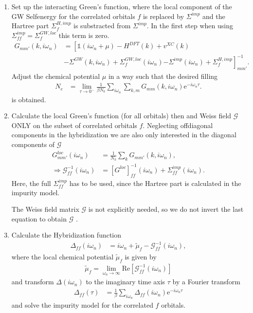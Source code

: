 \documentclass[12pt,a4paper]{scrartcl}
\numberwithin{equation}{section}
\newcommand{\GF}{Green's function}
\newcommand{\unity}{\mathds{1}}
\begin{document}
\begin{enumerate}
\item Set up the interacting {\GF}, where the local component of the GW
Selfenergy for the correlated orbitals $f$ is replaced by $\Sigma^{imp}$
and the Hartree part $\Sigma^{H,imp}_f$ is substracted from $\Sigma^{imp}$. 
In the first step when using $\Sigma^{imp}_{ff} =  \Sigma^{GW,loc}_{f}$ this 
term is zero.
\begin{align}
 G_{mm'}(k,i\omega_n) 
 &= \left[ \unity(i\omega_n+\mu ) -H^{DFT}(k) + v^{XC}(k) \right.\\
          &- \Sigma^{GW}(k,i\omega_n) 
          + \Sigma^{GW,loc}_f(i\omega_n)
          \left. - \Sigma^{imp}(i\omega_n)
          + \Sigma^{H,imp}_f \right]^{-1}_{mm'}.
\end{align}
Adjust the chemical potential $\mu$ in a way such that the desired
filling
\begin{align}
  N_e
 &= \lim_{\tau\rightarrow 0^-} \frac{1}{\beta N_k} 
                \sum_{i\omega_n}\sum_{k,m}G_{mm}(k,i\omega_n) \mathrm{e}^{-i\omega_n\tau}.
\end{align}
is obtained.

\item Calculate the local {\GF} (for all orbitals) then and Weiss field $\mathscr{G}$ ONLY
on the subset of correlated orbitals $f$. Neglecting
offdiagonal components in the hybridization we are also only interested 
in the diagonal components of $\mathscr{G}$
\begin{align}
 G^{loc}_{mm'}(i\omega_n) 
 &= \frac{1}{N_k}\sum_k  G_{mm'}(k,i\omega_n) ,\\
%
\Rightarrow \mathscr{G}^{-1}_{ff}(i\omega_n) &= [G^{loc} ]^{-1}_{ff} (i\omega_n)
                + \Sigma^{imp}_{ff}(i\omega_n) .
\end{align}
Here, the full $\Sigma^{imp}_{ff}$ has to be used, since 
the Hartree part is calculated in the impurity model.

The Weiss field matrix $\mathscr{G}$ is not explicitly needed, so
we do not invert the last equation to obtain $\mathscr{G}$ .

\item Calculate the Hybridization function
\begin{align}
 \Delta_{ff}(i\omega_n)
 &= i\omega_n + \tilde{\mu}_f -  \mathscr{G}^{-1}_{f	f}(i\omega_n),
\end{align}
where the local chemical potential $\tilde{\mu}_f$ is given by
\begin{align}
 \tilde{\mu}_f = \lim_{\omega_n\rightarrow \infty} \mathrm{Re}\left[ \mathscr{G}^{-1}_{ff}(i\omega_n) \right]
\end{align}
and transform $\Delta(i\omega_n)$ to the imaginary time axis $\tau$ by a Fourier transform
\begin{align}
 \Delta_{ff}(\tau) &= \frac{1}{\beta} \sum_{i\omega_n} \Delta_{ff}(i\omega_n) \mathrm{e}^{-i\omega_n\tau}
\end{align}
and solve the impurity model for the correlated $f$ orbitals.


\end{enumerate}
\end{document}

